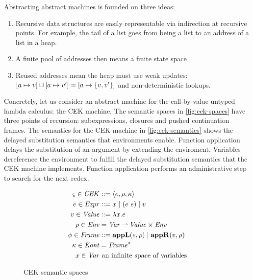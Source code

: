 Abstracting abstract machines is founded on three ideas:
\begin{enumerate}
\item{Recursive data structures are easily representable via indirection at recursive points. For example, the tail of a list goes from being a list to an address of a list in a heap.}
\item{A finite pool of addresses then means a finite state space}
\item{Reused addresses mean the heap must use weak updates: $[a \mapsto v]\sqcup[a \mapsto v'] = [a \mapsto \{ v,v' \}]$ and non-deterministic lookups.}
\end{enumerate}

Concretely, let us consider an abstract machine for the call-by-value untyped lambda calculus: the CEK machine.
%
The semantic spaces in \autoref{fig:cek-spaces} have three points of recursion: subexpressions, closures and pushed continuation frames.
%
The semantics for the CEK machine in \autoref{fig:cek-semantics} shows the delayed substitution semantics that environments enable.
%
Function application delays the substitution of an argument by extending the enviroment.
%
Variables dereference the environment to fulfill the delayed substitution semantics that the CEK machine implements.
%
Function application performs an administrative step to search for the next redex.
\begin{figure}\centering  
  \begin{align*}
    \varsigma \in \mathit{CEK} &::= \langle e, \rho, \kappa \rangle \\
    e \in \mathit{Expr} &::= x^{{}} \mathrel{\mid} (e\ e){} \mathrel{\mid} v \\
    v \in \mathit{Value} &::= \lambda{} x. e \\
    \rho \in \mathit{Env} &= \mathit{Var} \operatorname*{\rightharpoonup} \mathit{Value} \times \mathit{Env} \\
    \phi \in \mathit{Frame} &::= \mathbf{appL}(e,\rho) \mathrel{\mid} \mathbf{appR}(v,\rho) \\
    \kappa \in \mathit{Kont} &= \mathit{Frame}^* \\
    x \in \mathit{Var} & \text{ an infinite space of variables}
  \end{align*}
  \caption{CEK semantic spaces}
\label{fig:cek-spaces}
\end{figure}

